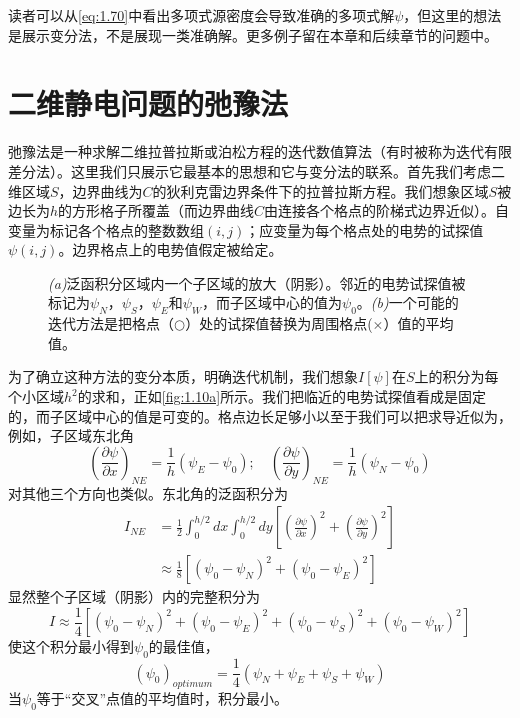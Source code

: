 \documentclass[12pt]{book}
\numberwithin{equation}{chapter}
\numberwithin{figure}{chapter}
\numberwithin{footnote}{page}
\begin{document}
读者可以从\autoref{eq:1.70}中看出多项式源密度会导致准确的多项式解$\psi$，但这里的想法是展示变分法，不是展现一类准确解。更多例子留在本章和后续章节的问题中。

\section{二维静电问题的弛豫法}\label{sec:1.13}

弛豫法是一种求解二维拉普拉斯或泊松方程的迭代数值算法（有时被称为迭代有限差分法）。这里我们只展示它最基本的思想和它与变分法的联系。首先我们考虑二维区域$S$，边界曲线为$C$的狄利克雷边界条件下的拉普拉斯方程。我们想象区域$S$被边长为$h$的方形格子所覆盖（而边界曲线$C$由连接各个格点的阶梯式边界近似）。自变量为标记各个格点的整数数组$(i,j)$；应变量为每个格点处的电势的试探值$\psi(i,j)$。边界格点上的电势值假定被给定。

\begin{figure}[!ht]
  \centering
  \hspace{5pt}
    \captionsetup{justification=raggedright, singlelinecheck=false}
  \caption{\textit{(a)}泛函积分区域内一个子区域的放大（阴影）。邻近的电势试探值被标记为$\psi_N$，$\psi_S$，$\psi_E$和$\psi_W$，而子区域中心的值为$\psi_0$。\textit{(b)}一个可能的迭代方法是把格点（$\bigcirc$）处的试探值替换为周围格点($\times$）值的平均值。}
  \label{fig:1.10}
\end{figure}

为了确立这种方法的变分本质，明确迭代机制，我们想象$I[\psi]$在$S$上的积分为每个小区域$h^2$的求和，正如\autoref{fig:1.10a}所示。我们把临近的电势试探值看成是固定的，而子区域中心的值是可变的。格点边长足够小以至于我们可以把求导近似为，例如，子区域东北角
$$(\frac{\partial \psi}{\partial x})_{NE}=\frac{1}{h}(\psi_E-\psi_0);\quad (\frac{\partial \psi}{\partial y})_{NE}=\frac{1}{h}(\psi_N-\psi_0)$$
对其他三个方向也类似。东北角的泛函积分为
\begin{equation}\label{eq:1.76}
    \begin{aligned}
        I_{NE}&=\frac{1}{2}\int_0^{h/2} dx\int_0^{h/2}dy[(\frac{\partial \psi}{\partial x})^2+(\frac{\partial \psi}{\partial y})^2]\\
        &\approx\frac{1}{8}[(\psi_0-\psi_N)^2+(\psi_0-\psi_E)^2]
    \end{aligned}
\end{equation}
显然整个子区域（阴影）内的完整积分为
\begin{equation}\label{eq:1.77}
    I\approx\frac{1}{4}[(\psi_0-\psi_N)^2+(\psi_0-\psi_E)^2+(\psi_0-\psi_S)^2+(\psi_0-\psi_W)^2]
\end{equation}
使这个积分最小得到$\psi_0$的最佳值，
\begin{equation}\label{eq:1.78}
    (\psi_0)_{optimum}=\frac{1}{4}(\psi_N+\psi_E+\psi_S+\psi_W)
\end{equation}
当$\psi_0$等于“交叉”点值的平均值时，积分最小。
\end{document}
